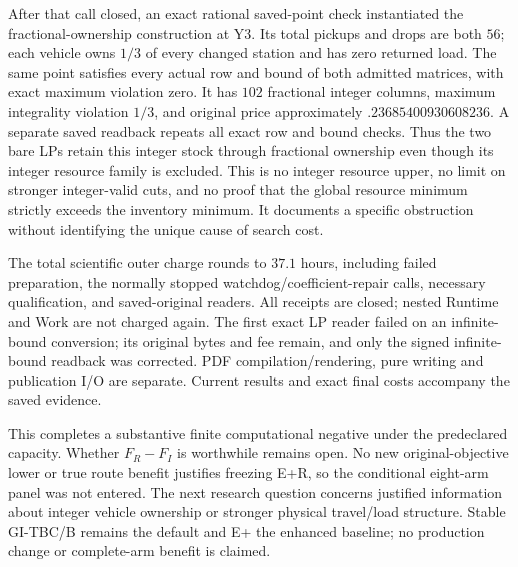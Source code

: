 After that call closed, an exact rational saved-point check instantiated
the fractional-ownership construction at Y3. Its total pickups and drops
are both $56$; each vehicle owns $1/3$ of every changed station and has
zero returned load. The same point satisfies every actual row and bound
of both admitted matrices, with exact maximum violation zero. It has
$102$ fractional integer columns, maximum integrality violation $1/3$,
and original price approximately $.23685400930608236$. A separate saved
readback repeats all exact row and bound checks. Thus the two bare LPs
retain this integer stock through fractional ownership even though its
integer resource family is excluded. This is no integer resource upper,
no limit on stronger integer-valid cuts, and no proof that the global
resource minimum strictly exceeds the inventory minimum. It documents a
specific obstruction without identifying the unique cause of search cost.

The total scientific outer charge rounds to $37.1$ hours, including failed
preparation, the normally stopped watchdog/coefficient-repair calls,
necessary qualification, and saved-original readers. All receipts are
closed; nested Runtime and Work are not charged again. The first exact
LP reader failed on an infinite-bound conversion; its original bytes and
fee remain, and only the signed infinite-bound readback was corrected.
PDF compilation/rendering, pure writing and publication I/O are separate.
Current results and exact final costs accompany the saved evidence.

This completes a substantive finite computational negative under the
predeclared capacity. Whether $F_R-F_I$ is worthwhile remains open.
No new original-objective lower or true route benefit justifies freezing
E+R, so the conditional eight-arm panel was not entered. The next research
question concerns justified information about integer vehicle ownership
or stronger physical travel/load structure. Stable GI-TBC/B remains the
default and E+ the enhanced baseline; no production change or complete-arm
benefit is claimed.
